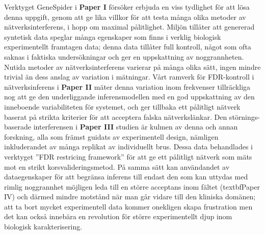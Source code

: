 Verktyget GeneSpider i \textbf{Paper I} försöker erbjuda en viss tydlighet för att lösa denna uppgift, genom att ge lika villkor för att testa många olika metoder av nätverksinterferens, i hopp om maximal pålitlighet. Miljön tillåter att genererad syntetisk data speglar många egenskaper som finns i verklig biologisk experimentellt framtagen data; denna data tillåter full kontroll, något som ofta saknas i faktiska undersökningar och ger en uppskattning av noggrannheten. Nutida metoder av nätverksinterferens varierar på många olika sätt, ingen mindre trivial än dess anslag av variation i mätningar. Vårt ramverk för FDR-kontroll i nätverksinferens i \textbf{Paper II} mäter denna variation inom frekvenser tillräckliga nog att ge den underliggande inferensmodellen med en god uppskattning av den inneboende variabiliteten för systemet, och ger tillbaka ett pålitligt nätverk baserat på strikta kriterier för att acceptera falska nätverkslänkar. Den störnings-baserade interferensen i \textbf{Paper III}  studien är kulmen av denna och annan forskning, alla som främst guidats av experimentell design, nämligen inkluderandet av många replikat av individuellt brus. Dessa data behandlades i verktyget ”FDR restricing framework” för att ge ett pålitligt nätverk som mäts mot en strikt korsvalideringsmetod. På samma sätt kan användandet av dataegenskaper för att begränsa inferens till endast den som kan uttydas med rimlig noggrannhet möjligen leda till en större acceptans inom fältet (textbf{Paper IV}) och därmed mindre motstånd när man går vidare till den kliniska domänen; att ta bort mycket experimentell data kommer onekligen skapa frustration men det kan också innebära en revolution för större experimentellt djup inom biologisk karakterisering. \\







